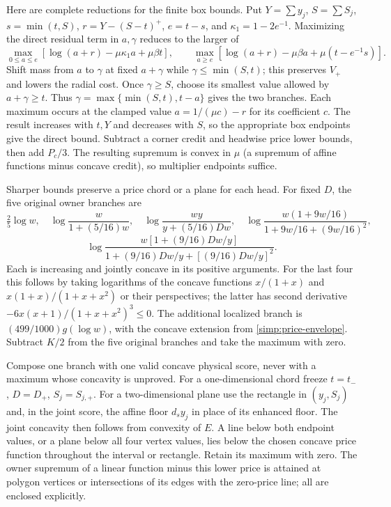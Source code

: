 Here are complete reductions for the finite box bounds. Put
$Y=\sum y_j$, $S=\sum S_j$, $s=\min(t,S)$, $r=Y-(S-t)^+$,
$e=t-s$, and $\kappa_1=1-2e^{-1}$. Maximizing the direct residual term
in $a,\gamma$ reduces to the larger of
\begin{equation}\label{simp:two-residual-branches}
 \max_{0\le a\le e}[\log(a+r)-\mu\kappa_1a+\mu\beta t],\qquad
 \max_{a\ge e}[\log(a+r)-\mu\beta a+\mu(t-e^{-1}s)].
\end{equation}
Shift mass from $a$ to $\gamma$ at fixed $a+\gamma$ while
$\gamma\le\min(S,t)$; this preserves $V_+$ and lowers the radial cost.
Once $\gamma\ge S$, choose its smallest value allowed by $a+\gamma\ge t$.
Thus $\gamma=\max\{\min(S,t),t-a\}$ gives the two branches.
Each maximum occurs at the clamped value $a=1/(\mu c)-r$ for its
coefficient $c$. The result increases with $t,Y$ and decreases with $S$,
so the appropriate box endpoints give the direct bound. Subtract a
corner credit and headwise price lower bounds, then add $P_c/3$.
The resulting supremum is convex in $\mu$ (a supremum of affine functions
minus concave credit), so multiplier endpoints suffice.

Sharper bounds preserve a price chord or a plane for each head.
For fixed $D$, the five original owner branches are
\[
 \tfrac25\log w,\quad
 \log\frac{w}{1+(5/16)w},\quad
 \log\frac{wy}{y+(5/16)Dw},\quad
 \log\frac{w(1+9w/16)}{1+9w/16+(9w/16)^2},
\]
\[
 \log\frac{w[1+(9/16)Dw/y]}{1+(9/16)Dw/y+[(9/16)Dw/y]^2}.
\]
Each is increasing and jointly concave in its positive arguments.
For the last four this follows by taking logarithms of the concave
functions $x/(1+x)$ and $x(1+x)/(1+x+x^2)$ or their perspectives;
the latter has second derivative $-6x(x+1)/(1+x+x^2)^3\le0$.
The additional localized branch is $(499/1000)g(\log w)$, with the
concave extension from \eqref{simp:price-envelope}. Subtract $K/2$ from
the five original branches and take the maximum with zero.

Compose one branch with one valid concave physical score, never with
a maximum whose concavity is unproved. For a one-dimensional chord
freeze $t=t_-$, $D=D_+$, $S_j=S_{j,+}$. For a two-dimensional plane
use the rectangle in $(y_j,S_j)$ and, in the joint score, the affine
floor $d_sy_j$ in place of its enhanced floor. The joint concavity
then follows from convexity of $E$. A line below both endpoint values,
or a plane below all four vertex values, lies below the chosen concave
price function throughout the interval or rectangle. Retain its maximum
with zero. The owner supremum of a linear function minus this lower
price is attained at polygon vertices or intersections of its edges
with the zero-price line; all are enclosed explicitly.

